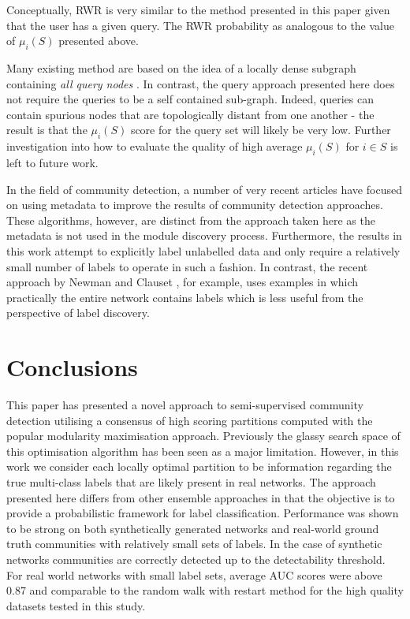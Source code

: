 \documentclass[sigconf]{acmart}
\begin{document}
Conceptually, RWR is very similar to the method presented in this paper given that the user has a given query.
The RWR probability as analogous to the value of $\mu_i(S)$ presented above.

Many existing method are based on the idea of a locally dense subgraph containing \textit{all query nodes} \cite{benson2016higher}.
In contrast, the query approach presented here does not require the queries to be a self contained sub-graph.
Indeed, queries can contain spurious nodes that are topologically distant from one another - the result is that the $\mu_i(S)$ score for the query set will likely be very low.
Further investigation into how to evaluate the quality of high average $\mu_i(S)$ for $i \in S$ is left to future work.

In the field of community detection, a number of very recent articles have focused on using metadata to improve the results of community detection approaches.
These algorithms, however, are distinct from the approach taken here as the metadata is not used in the module discovery process.
Furthermore, the results in this work attempt to explicitly label unlabelled data and only require a relatively small number of labels to operate in such a fashion.
In contrast,  the recent approach by Newman and Clauset \cite{newman2016structure}, for example, uses examples in which practically the entire network contains labels which is less useful from the perspective of label discovery.

\section{Conclusions}
This paper has presented a novel approach to semi-supervised community detection utilising a consensus of high scoring partitions computed with the popular modularity maximisation approach.
Previously the glassy search space of this optimisation algorithm has been seen as a major limitation.
However, in this work we consider each locally optimal partition to be information regarding the true multi-class labels that are likely present in real networks.
The approach presented here differs from other ensemble approaches in that the objective is to provide a probabilistic framework for label classification.
Performance was shown to be strong on both synthetically generated networks and real-world ground truth communities with relatively small sets of labels.
In the case of synthetic networks communities are correctly detected up to the detectability threshold.
For real world networks with small label sets, average AUC scores were above 0.87 and comparable to the random walk with restart method for the high quality datasets tested in this study.
\end{document}
